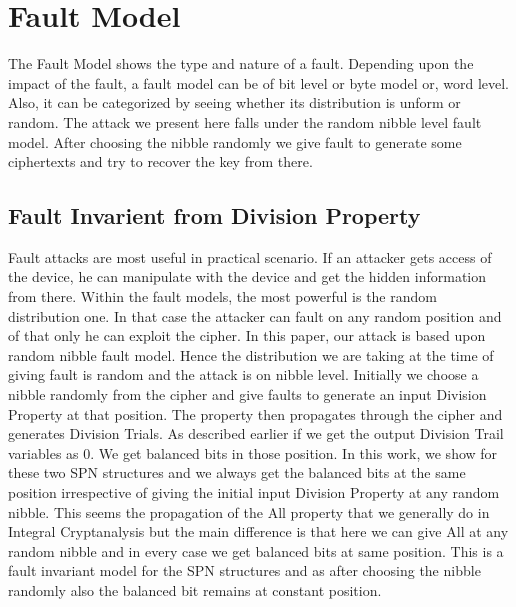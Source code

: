 \section{Fault Model}	\label{sec:fault_model}
The Fault Model shows the type and nature of a fault. Depending upon the impact of the fault, a fault model can be of bit level or byte model or, word level. Also, it can be categorized by seeing whether its distribution is unform or random.
	The attack we present here falls under the random nibble level fault model. After choosing the nibble randomly we give fault to generate some ciphertexts and try to recover the key from there.


\subsection{Fault Invarient from Division Property}		\label{subsec:fault_invarient_from_division_property}
Fault attacks are most useful in practical scenario. If an attacker gets access of the device, he can manipulate with the device and get the hidden information from there. Within the fault models, the most powerful is the random distribution one. In that case the attacker can fault on any random position and of that only he can exploit the cipher. 
	In this paper, our attack is based upon random nibble fault model. Hence the distribution we are taking at the time of giving fault is random and the attack is on nibble level. Initially we choose a nibble randomly from the cipher and give faults to generate an input Division Property at that position. The property then propagates through the cipher and generates Division Trials. As described earlier if we get the output Division Trail variables as 0. We get balanced bits in those position. In this work, we show for these two SPN structures \present and \gift we always get the balanced bits at the same position irrespective of giving the initial input Division Property at any random nibble. This seems the propagation of the All property that we generally do in Integral Cryptanalysis but the main difference is that here we can give All at any random nibble and in every case we get balanced bits at same position. This is a fault invariant model for the SPN structures \present and \gift as after choosing the nibble randomly also the balanced bit remains at constant position. 



